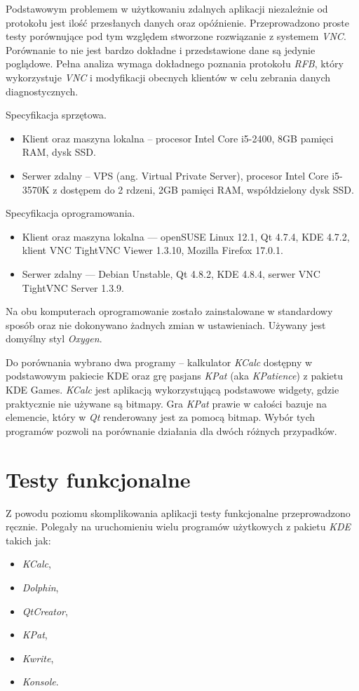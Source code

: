 Podstawowym problemem w użytkowaniu zdalnych aplikacji niezależnie od protokołu jest ilość przesłanych danych oraz opóźnienie. Przeprowadzono proste testy porównujące pod tym względem stworzone rozwiązanie z systemem \emph{VNC}. Porównanie to nie jest bardzo dokładne i przedstawione dane są jedynie poglądowe. Pełna analiza wymaga dokładnego poznania protokołu \emph{RFB}, który wykorzystuje \emph{VNC} i modyfikacji obecnych klientów w celu zebrania danych diagnostycznych.

Specyfikacja sprzętowa.
\begin{itemize}
\item Klient oraz maszyna lokalna -- procesor Intel Core i5-2400, 8GB pamięci RAM, dysk SSD.
\item Serwer zdalny -- VPS (ang. Virtual Private Server), procesor Intel Core i5-3570K z dostępem do 2 rdzeni, 2GB pamięci RAM, współdzielony dysk SSD.
\end{itemize}

Specyfikacja oprogramowania.
\begin{itemize}
\item Klient oraz maszyna lokalna --- openSUSE Linux 12.1, Qt 4.7.4, KDE 4.7.2, klient VNC TightVNC Viewer 1.3.10, Mozilla Firefox 17.0.1.
\item Serwer zdalny --- Debian Unstable, Qt 4.8.2, KDE 4.8.4, serwer VNC TightVNC Server 1.3.9.
\end{itemize}

Na obu komputerach oprogramowanie zostało zainstalowane w standardowy sposób oraz nie dokonywano żadnych zmian w ustawieniach. Używany jest domyślny styl \emph{Oxygen}.

Do porównania wybrano dwa programy -- kalkulator \emph{KCalc} dostępny w podstawowym pakiecie KDE oraz grę pasjans \emph{KPat} (aka \emph{KPatience}) z pakietu KDE Games. \emph{KCalc} jest aplikacją wykorzystującą podstawowe widgety, gdzie praktycznie nie używane są bitmapy. Gra \emph{KPat} prawie w całości bazuje na elemencie, który w \emph{Qt} renderowany jest za pomocą bitmap. Wybór tych programów pozwoli na porównanie działania dla dwóch różnych przypadków.

\section {Testy funkcjonalne}
Z powodu poziomu skomplikowania aplikacji testy funkcjonalne przeprowadzono ręcznie. Polegały na uruchomieniu wielu programów użytkowych z pakietu \emph{KDE} takich jak:
\begin{itemize}
\item \emph{KCalc},
\item \emph{Dolphin},
\item \emph{QtCreator},
\item \emph{KPat},
\item \emph{Kwrite},
\item \emph{Konsole}.
\end{itemize}

